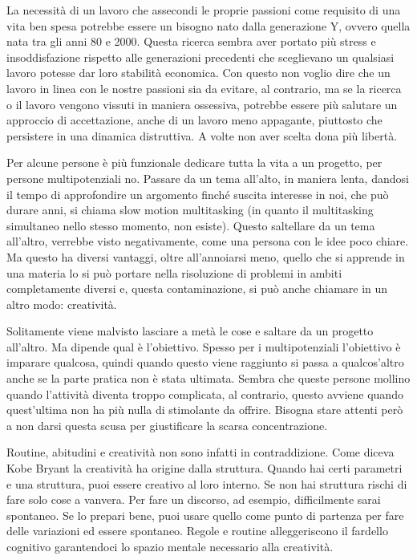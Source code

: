 \documentclass[12pt]{book} %
\begin{document}
\begin{mdframed}[linewidth=1pt]
La necessità di un lavoro che assecondi le proprie passioni come requisito di una vita ben spesa potrebbe essere un bisogno nato dalla
generazione Y, ovvero quella nata tra gli anni 80 e 2000. Questa ricerca sembra aver portato più stress e
insoddisfazione rispetto alle generazioni precedenti che sceglievano un qualsiasi lavoro potesse dar loro stabilità
economica. Con questo non voglio dire che un lavoro in linea con le nostre passioni sia da evitare, al contrario, ma se la ricerca o il lavoro vengono vissuti in maniera ossessiva, potrebbe essere più salutare un approccio di accettazione, anche di un lavoro meno appagante, piuttosto che persistere in una dinamica distruttiva. A volte non aver scelta dona più libertà.

Per alcune persone è più funzionale dedicare tutta la vita a un progetto, per persone multipotenziali no. Passare da un tema
all'alto, in maniera lenta, dandosi il tempo di approfondire un argomento finché suscita interesse
in noi, che può durare anni, si chiama slow motion multitasking (in quanto il multitasking simultaneo nello stesso
momento, non esiste). Questo saltellare da un tema all'altro, verrebbe visto negativamente, come
una persona con le idee poco chiare. Ma questo ha diversi vantaggi, oltre all'annoiarsi meno,
quello che si apprende in una materia lo si può portare nella risoluzione di problemi in ambiti completamente diversi
e, questa contaminazione, si può anche chiamare in un altro modo:
creatività.

Solitamente viene malvisto lasciare a metà le cose e saltare da un progetto all'altro. Ma dipende
qual è l'obiettivo. Spesso per i multipotenziali l'obiettivo è imparare
qualcosa, quindi quando questo viene raggiunto si passa a qualcos'altro anche se la parte pratica
non è stata ultimata. Sembra che queste persone mollino quando l'attività diventa troppo
complicata, al contrario, questo avviene quando quest'ultima non ha più nulla di stimolante da
offrire. Bisogna stare attenti però a non darsi questa scusa per giustificare la scarsa concentrazione.

Routine, abitudini e creatività non sono infatti in contraddizione. Come diceva Kobe Bryant la creatività ha origine
dalla struttura. Quando hai certi parametri e una struttura, puoi essere creativo al loro interno. Se non hai struttura
rischi di fare solo cose a vanvera. Per fare un discorso, ad esempio, difficilmente sarai spontaneo. Se lo prepari bene, puoi usare quello come punto di partenza per fare delle variazioni ed essere spontaneo. Regole e routine alleggeriscono il fardello cognitivo garantendoci lo spazio mentale
necessario alla creatività.


\end{mdframed}
\end{document}

